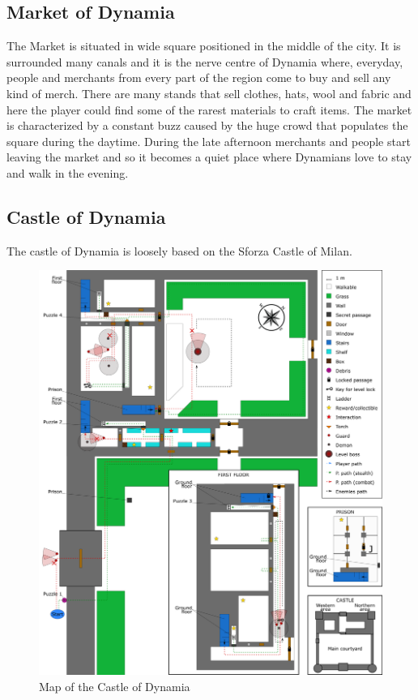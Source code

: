 \subsection{Market of Dynamia}
The Market is situated in wide square positioned in the middle of the city. It is surrounded  many canals and it is the nerve centre of Dynamia where, everyday, people and merchants from every part of the region come to buy and sell any kind of merch. There are many stands that sell clothes, hats, wool and fabric and here the player could find some of the rarest materials to craft items. The market is characterized by a constant buzz caused by the huge crowd that populates  the square during the daytime. During the late afternoon merchants and people start leaving the market and so it becomes a quiet place where Dynamians love to stay and walk in the evening.

\subsection{Castle of Dynamia}
The castle of Dynamia is loosely based on the Sforza Castle of Milan.

\begin{figure}[H]
  \centering
  \includegraphics[width=\textwidth]{Images/Maps/castleOfDynamia}
  \caption{Map of the Castle of Dynamia}
\end{figure}

